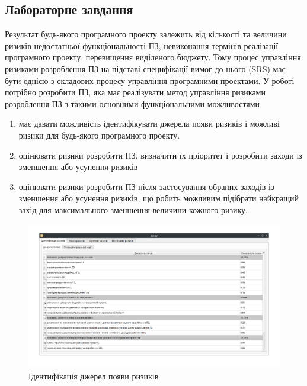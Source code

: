 \documentclass[14pt]{extreport}
\begin{document}
\begin{normalsize}
	\section*{Лабораторне завдання}
	Результат будь-якого програмного проекту залежить від кількості та величини ризиків недостатньої функціональності ПЗ, невиконання термінів реалізації програмного проекту, перевищення виділеного бюджету. Тому процес управління ризиками розроблення ПЗ на підставі специфікації вимог до нього (SRS) має бути однією з складових процесу управління програмними проектами.  У роботі потрібно розробити ПЗ, яка має реалізувати метод управління ризиками розроблення ПЗ з такими основними функціональними можливостями
	\begin{enumerate}
		\item має давати можливість ідентифікувати джерела появи ризиків і можливі ризики для будь-якого програмного проекту.
		\item оцінювати ризики розробити ПЗ, визначити їх пріоритет і розробити заходи із зменшення або усунення ризиків
		\item оцінювати ризики розробити ПЗ після застосування обраних заходів із зменшення або усунення ризиків, що робить можливим підібрати найкращий захід для максимального зменшення величини кожного ризику.
	\end{enumerate}
	
	\begin{figure}[H]
		\centering
		\includegraphics[scale=0.45]{1}
		\caption{Ідентифікація джерел появи ризиків}
	\end{figure}


\end{normalsize}
\end{document}
